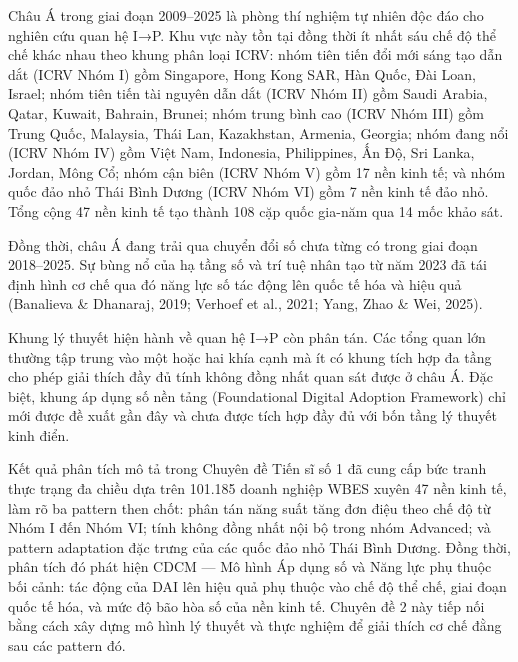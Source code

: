 \documentclass[12pt,a4paper]{article}
\begin{document}
Châu Á trong giai đoạn 2009--2025 là phòng thí nghiệm tự nhiên độc đáo
cho nghiên cứu quan hệ I→P. Khu vực này tồn tại đồng thời ít nhất sáu
chế độ thể chế khác nhau theo khung phân loại ICRV: nhóm tiên tiến đổi
mới sáng tạo dẫn dắt (ICRV Nhóm I) gồm Singapore, Hong Kong SAR, Hàn
Quốc, Đài Loan, Israel; nhóm tiên tiến tài nguyên dẫn dắt (ICRV Nhóm II)
gồm Saudi Arabia, Qatar, Kuwait, Bahrain, Brunei; nhóm trung bình cao
(ICRV Nhóm III) gồm Trung Quốc, Malaysia, Thái Lan, Kazakhstan, Armenia,
Georgia; nhóm đang nổi (ICRV Nhóm IV) gồm Việt Nam, Indonesia,
Philippines, Ấn Độ, Sri Lanka, Jordan, Mông Cổ; nhóm cận biên (ICRV Nhóm
V) gồm 17 nền kinh tế; và nhóm quốc đảo nhỏ Thái Bình Dương (ICRV Nhóm
VI) gồm 7 nền kinh tế đảo nhỏ. Tổng cộng 47 nền kinh tế tạo thành 108
cặp quốc gia-năm qua 14 mốc khảo sát.

Đồng thời, châu Á đang trải qua chuyển đổi số chưa từng có trong giai
đoạn 2018--2025. Sự bùng nổ của hạ tầng số và trí tuệ nhân tạo từ năm
2023 đã tái định hình cơ chế qua đó năng lực số tác động lên quốc tế hóa
và hiệu quả (Banalieva \& Dhanaraj, 2019; Verhoef et al., 2021; Yang,
Zhao \& Wei, 2025).

Khung lý thuyết hiện hành về quan hệ I→P còn phân tán. Các tổng quan lớn
thường tập trung vào một hoặc hai khía cạnh mà ít có khung tích hợp đa
tầng cho phép giải thích đầy đủ tính không đồng nhất quan sát được ở
châu Á. Đặc biệt, khung áp dụng số nền tảng (Foundational Digital
Adoption Framework) chỉ mới được đề xuất gần đây và chưa được tích hợp
đầy đủ với bốn tầng lý thuyết kinh điển.

Kết quả phân tích mô tả trong Chuyên đề Tiến sĩ số 1 đã cung cấp bức
tranh thực trạng đa chiều dựa trên 101.185 doanh nghiệp WBES xuyên 47
nền kinh tế, làm rõ ba pattern then chốt: phân tán năng suất tăng đơn
điệu theo chế độ từ Nhóm I đến Nhóm VI; tính không đồng nhất nội bộ
trong nhóm Advanced; và pattern adaptation đặc trưng của các quốc đảo
nhỏ Thái Bình Dương. Đồng thời, phân tích đó phát hiện CDCM --- Mô hình
Áp dụng số và Năng lực phụ thuộc bối cảnh: tác động của DAI lên hiệu quả
phụ thuộc vào chế độ thể chế, giai đoạn quốc tế hóa, và mức độ bão hòa
số của nền kinh tế. Chuyên đề 2 này tiếp nối bằng cách xây dựng mô hình
lý thuyết và thực nghiệm để giải thích cơ chế đằng sau các pattern đó.
\end{document}
